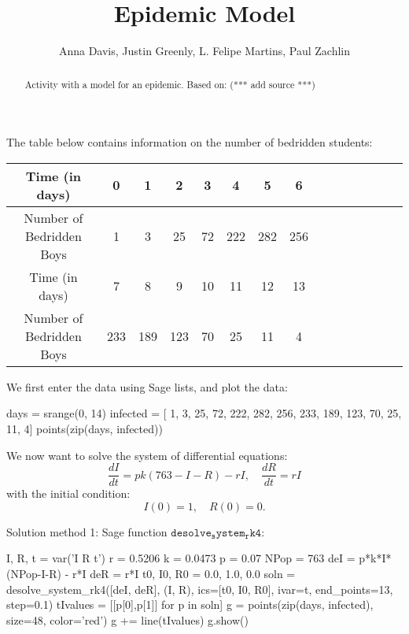 \documentclass{ximera}
\title{Epidemic Model}
\author{Anna Davis, Justin Greenly, L. Felipe Martins, Paul Zachlin}
\begin{document}
\begin{abstract}
Activity with a model for an epidemic. Based on: (*** add source ***)
\end{abstract}

\maketitle

The table below contains information on the number of bedridden students:

\begin{tabular}{|c|c|c|c|c|c|c|c|c|c|c|c|c|c|c|}\hline
Time (in days)           & 0 & 1 &  2 &  3 &  4 &    5 &   6  \\\hline
Number of Bedridden Boys & 1 & 3 & 25 & 72 & 222 & 282 & 256 \\\hline\hline
Time (in days) &             7 &   8 &   9 & 10 & 11 & 12 & 13\\\hline
Number of Bedridden Boys & 233 & 189 & 123 & 70 & 25 & 11 &  4\\\hline
\end{tabular}

We first enter the data using Sage lists, and plot the data:

\begin{sageCell}
days = srange(0, 14)
infected = [  1,   3,  25, 72, 222, 282, 256, 
            233, 189, 123, 70,  25,  11,   4]
points(zip(days, infected))
\end{sageCell}

We now want to solve the system of differential equations:
\[
\frac{dI}{dt}=pk(763-I-R)-rI,\quad\frac{dR}{dt}=rI
\]
with the initial condition:
\[
I(0)=1,\quad R(0)=0.
\]

Solution method 1: Sage function $\mathtt{desolve_system_rk4}$:

\begin{sageCell}
I, R, t = var('I R t')
r = 0.5206
k = 0.0473
p = 0.07
NPop = 763
deI = p*k*I*(NPop-I-R) - r*I
deR = r*I
t0, I0, R0 = 0.0, 1.0, 0.0
soln = desolve_system_rk4([deI, deR], (I, R), 
                          ics=[t0, I0, R0], ivar=t,
                          end_points=13, step=0.1)
tIvalues = [[p[0],p[1]] for p in soln]
g = points(zip(days, infected), size=48, color='red')
g += line(tIvalues)
g.show()
\end{sageCell}
\end{document}
